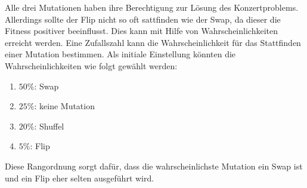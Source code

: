 Alle drei Mutationen haben ihre Berechtigung zur Lösung des Konzertproblems. Allerdings sollte 
der Flip nicht so oft sattfinden wie der Swap, da dieser die Fitness positiver beeinflusst. 
Dies kann mit Hilfe von Wahrscheinlichkeiten erreicht werden. Eine Zufallszahl kann die Wahrscheinlichkeit 
für das Stattfinden einer Mutation bestimmen. 
Als initiale Einstellung könnten die Wahrscheinlichkeiten wie folgt gewählt werden: 
\begin{enumerate}
    \item $50\%$: Swap
    \item $25\%$: keine Mutation
    \item $20\%$: Shuffel
    \item $5\%$: Flip
\end{enumerate}
Diese Rangordnung sorgt dafür, dass die wahrscheinlichste Mutation ein Swap ist und ein Flip eher selten ausgeführt wird.
